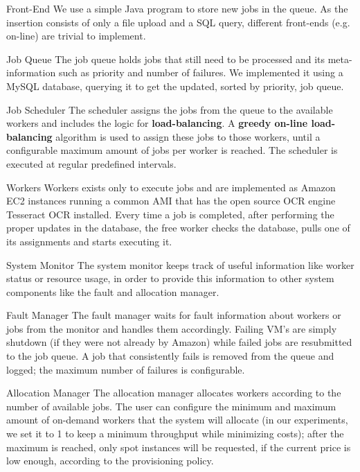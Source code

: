 \documentclass[a4paper]{IEEEtran}
\begin{document}
\begin{LaTeXdescription}

\item[Front-End] We use a simple Java program to store new jobs in the queue. As the insertion consists of only a file upload and a SQL query, different front-ends (e.g. on-line) are trivial to implement.

\item[Job Queue]
The job queue holds jobs that still need to be processed and its meta-information such as priority and number of failures. We implemented it using a MySQL database, querying it to get the updated, sorted by priority, job queue.

\item[Job Scheduler]
The scheduler assigns the jobs from the queue to the available workers and includes the logic for \textbf{load-balancing}. A \textbf{greedy on-line load-balancing} algorithm \cite{kleinberg2006} is used to assign these jobs to those workers, until a configurable maximum amount of jobs per worker is reached. The scheduler is executed at regular predefined intervals.

\item[Workers]
Workers exists only to execute jobs and are implemented as Amazon EC2 instances running a common AMI that has the open source OCR engine Tesseract OCR installed. Every time a job is completed, after performing the proper updates in the database, the free worker checks the database, pulls one of its assignments and starts executing it.

\item[System Monitor]
The system monitor keeps track of useful information like worker status or resource usage, in order to provide this information to other system components like the fault and allocation manager.

\item[Fault Manager]
The fault manager waits for fault information about workers or jobs from the monitor and handles them accordingly. Failing VM's are simply shutdown (if they were not already by Amazon) while failed jobs are resubmitted to the job queue. A job that consistently fails is removed from the queue and logged; the maximum number of failures is configurable.

\item[Allocation Manager]
The allocation manager allocates workers according to the number of available jobs. The user can configure the minimum and maximum amount of on-demand workers that the system will allocate (in our experiments, we set it to 1 to keep a minimum throughput while minimizing costs); after the maximum is reached, only spot instances will be requested, if the current price is low enough, according to the provisioning policy.


\end{LaTeXdescription}
\end{document}
